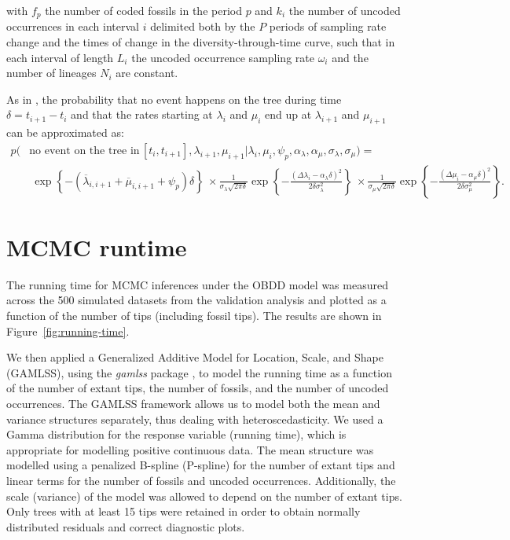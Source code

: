 \documentclass[oupdraft]{sysbio}
\def \bar{\overline}
\newcommand{\revised}[1]{{\color{blue} #1}}
\begin{document}
with $f_p$ the number of \revised{coded} fossils in the period $p$ and $k_i$ the number of \revised{uncoded} occurrences in each interval $i$ delimited both by the $P$ periods of sampling rate change and the times of change in the diversity-through-time curve, such that in each interval of length $L_i$ the \revised{uncoded} occurrence sampling rate $\omega_i$ and the number of lineages $N_i$ are constant.

As in \citet{quintero_loss_2025}, the probability that no event happens on the tree during time $\delta = t_{i+1} - t_i$ and that the rates starting at $\lambda_i$ and $\mu_i$ end up at $\lambda_{i+1}$ and $\mu_{i+1}$ can be approximated as:
\begin{align*}
  p(& \text{no event on the tree in}\,[t_i, t_{i+1}], \lambda_{i+1}, \mu_{i+1} | \lambda_i, \mu_i, \psi_p, \alpha_{\lambda}, \alpha_{\mu}, \sigma_{\lambda}, \sigma_{\mu}) = \\
  & \: \exp \left\{- (\bar{\lambda}_{i,i+1} + \bar{\mu}_{i,i+1} + \psi_p) \delta \right\} \: \times
  \frac{1}{\sigma_{\lambda} \sqrt{2\pi \delta}} \exp \left\{ - \frac{(\Delta \lambda_i - \alpha_{\lambda} \delta)^2 }{ 2 \delta \sigma_{\lambda}^2} \right\} \: \times
  \frac{1}{\sigma_{\mu} \sqrt{2\pi \delta}} \exp \left\{ - \frac{(\Delta \mu_i - \alpha_{\mu}\delta)^2 }{ 2 \delta \sigma_{\mu}^2} \right\}.
\end{align*}

\section{MCMC runtime} \label{SM-runtime}

The running time for MCMC inferences under the OBDD model was measured across the 500 simulated datasets from the validation analysis and plotted as a function of the number of tips (including fossil tips). The results are shown in Figure~\ref{fig:running-time}.

We then applied a Generalized Additive Model for Location, Scale, and Shape (GAMLSS), using the \textit{gamlss} package \citep{rigby_generalized_2005, r_core_team_r_2018}, to model the running time as a function of the number of extant tips, the number of fossils, and the number of \revised{uncoded} occurrences. The GAMLSS framework allows us to model both the mean and variance structures separately, thus dealing with heteroscedasticity. We used a Gamma distribution for the response variable (running time), which is appropriate for modelling positive continuous data. The mean structure was modelled using a penalized B-spline (P-spline) for the number of extant tips and linear terms for the number of fossils and \revised{uncoded} occurrences. Additionally, the scale (variance) of the model was allowed to depend on the number of extant tips. Only trees with at least 15 tips were retained in order to obtain normally distributed residuals and correct diagnostic plots.
\end{document}
